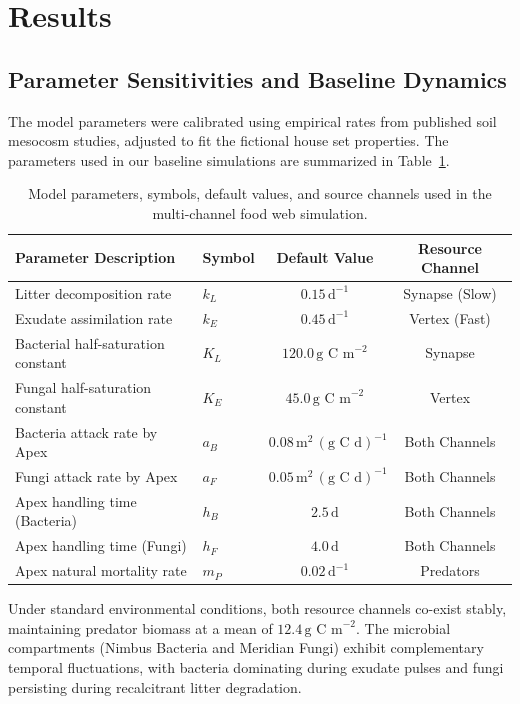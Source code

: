 \section{Results}

\subsection{Parameter Sensitivities and Baseline Dynamics}

The model parameters were calibrated using empirical rates from published soil mesocosm studies, adjusted to fit the fictional house set properties. The parameters used in our baseline simulations are summarized in Table~\ref{tab:model_parameters}.

\begin{table}[htbp]
\centering
\caption{Model parameters, symbols, default values, and source channels used in the multi-channel food web simulation.}
\label{tab:model_parameters}
\vspace{0.2cm}
\begin{tabularx}{\textwidth}{lXcc}
\toprule
\textbf{Parameter Description} & \textbf{Symbol} & \textbf{Default Value} & \textbf{Resource Channel} \\
\midrule
Litter decomposition rate & $k_L$ & $0.15\,\text{d}^{-1}$ & Synapse (Slow) \\
Exudate assimilation rate & $k_E$ & $0.45\,\text{d}^{-1}$ & Vertex (Fast) \\
Bacterial half-saturation constant & $K_L$ & $120.0\,\text{g C m}^{-2}$ & Synapse \\
Fungal half-saturation constant & $K_E$ & $45.0\,\text{g C m}^{-2}$ & Vertex \\
Bacteria attack rate by Apex & $a_B$ & $0.08\,\text{m}^2\,(\text{g C d})^{-1}$ & Both Channels \\
Fungi attack rate by Apex & $a_F$ & $0.05\,\text{m}^2\,(\text{g C d})^{-1}$ & Both Channels \\
Apex handling time (Bacteria) & $h_B$ & $2.5\,\text{d}$ & Both Channels \\
Apex handling time (Fungi) & $h_F$ & $4.0\,\text{d}$ & Both Channels \\
Apex natural mortality rate & $m_P$ & $0.02\,\text{d}^{-1}$ & Predators \\
\bottomrule
\end{tabularx}
\end{table}

Under standard environmental conditions, both resource channels co-exist stably, maintaining predator biomass at a mean of $12.4\,\text{g C m}^{-2}$. The microbial compartments (Nimbus Bacteria and Meridian Fungi) exhibit complementary temporal fluctuations, with bacteria dominating during exudate pulses and fungi persisting during recalcitrant litter degradation.

